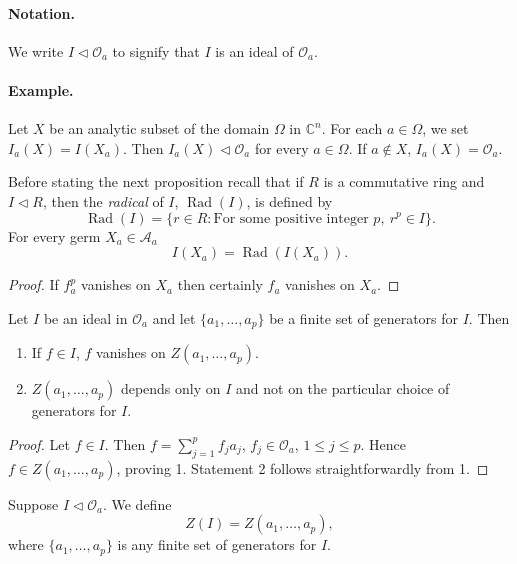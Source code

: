 \paragraph*{Notation.} We write $I\lhd\mathcal O_a$ to signify that $I$ is an ideal of $\mathcal O_a$.
\paragraph*{Example.} Let $X$ be an analytic subset of the domain $\Omega$ in $\mathbb C^n$. For each $a\in\Omega$, we set $I_a(X)=I(X_a)$. Then $I_a(X)\lhd\mathcal O_a$ for every $a\in\Omega$. If $a\notin X$, $I_a(X)=\mathcal O_a$.

Before stating the next proposition recall that if $R$ is a commutative ring and $I\lhd R$, then the \emph{radical} of $I$, $\operatorname{Rad}(I)$, is defined by
\[\operatorname{Rad}(I)=\{r\in R:\text{For some positive integer }p,\ r^p\in I\}.\]
 For every germ $X_a\in\mathcal A_a$
\[I(X_a)=\operatorname{Rad}(I(X_a)).\]
\begin{proof}If $f_a^p$ vanishes on $X_a$ then certainly $f_a$ vanishes on $X_a$.\end{proof}
 Let $I$ be an ideal in $\mathcal O_a$ and let $\{a_1,\ldots,a_p\}$ be a finite set of generators for $I$. Then
\begin{enumerate}
\item If $f\in I$, $f$ vanishes on $Z(a_1,\ldots,a_p)$.
\item $Z(a_1,\ldots,a_p)$ depends only on $I$ and not on the particular choice of generators for $I$.
\end{enumerate}
\begin{proof}
Let $f\in I$. Then $f=\sum_{j=1}^p f_ja_j$, $f_j\in\mathcal O_a$, $1\leq j\leq p$. Hence $f\in Z(a_1,\ldots,a_p)$, proving 1. Statement 2 follows straightforwardly from 1.
\end{proof}
 Suppose $I\lhd\mathcal O_a$. We define
\[Z(I)=Z(a_1,\ldots,a_p),\]
where $\{a_1,\ldots,a_p\}$ is any finite set of generators for $I$.

